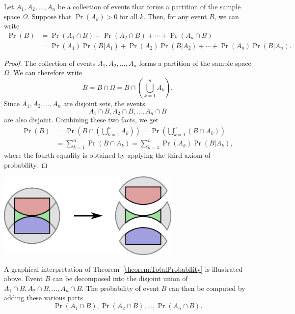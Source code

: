 \begin{theorem} \label{theorem:TotalProbability} 
Let $A_1, A_2, \ldots, A_n$ be a collection of events that forms a partition of the sample space $\Omega$.
Suppose that $\Pr (A_k) > 0$ for all $k$.
Then, for any event $B$, we can write
\begin{equation*}
\begin{split}
\Pr (B) &= \Pr (A_1 \cap B) + \Pr (A_2 \cap B) + \cdots + \Pr (A_n \cap B) \\
&= \Pr (A_1) \Pr (B | A_1) + \Pr (A_2) \Pr (B | A_2) + \cdots + \Pr (A_n) \Pr (B | A_n ) .
\end{split}
\end{equation*}
\end{theorem}
\begin{proof}
The collection of events $A_1, A_2, \ldots, A_n$ forms a partition of the sample space $\Omega$.
We can therefore write
\begin{equation*}
B = B \cap \Omega = B \cap \left( \bigcup_{k=1}^n A_k \right) .
\end{equation*}
Since $A_1, A_2, \ldots, A_n$ are disjoint sets, the events
\begin{equation*}
A_1 \cap B, A_2 \cap B, \ldots, A_n \cap B
\end{equation*}
are also disjoint.
Combining these two facts, we get
\begin{equation*}
\begin{split}
\Pr (B)
&= \Pr \left( B \cap \left( \bigcup_{k=1}^n A_k \right) \right)
= \Pr \left( \bigcup_{k=1}^n (B \cap A_k) \right) \\
&= \sum_{k=1}^n \Pr \left( B \cap A_k \right)
= \sum_{k=1}^n \Pr (A_k) \Pr \left( B |A_k \right) ,
\end{split}
\end{equation*}
where the fourth equality is obtained by applying the third axiom of probability.
\end{proof}

\begin{center}
\includegraphics[height=4.23cm]{Figures/3Chapter/setpartition3}
\end{center}
A graphical interpretation of Theorem~\ref{theorem:TotalProbability} is illustrated above.
Event $B$ can be decomposed into the disjoint union of $A_1 \cap B, A_2 \cap B, \ldots, A_n \cap B$.
The probability of event $B$ can then be computed by adding these various parts
\begin{equation*}
\Pr (A_1 \cap B), \Pr (A_2 \cap B), \ldots, \Pr (A_n \cap B) .
\end{equation*}

